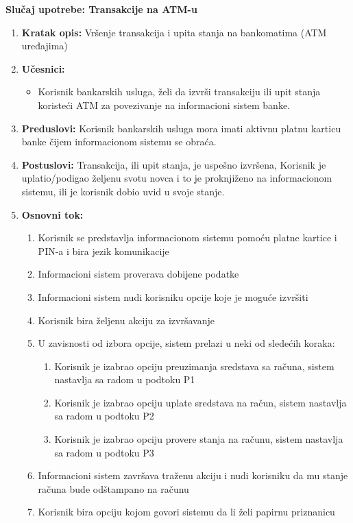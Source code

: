 \documentclass{article}
\begin{document}
\textbf{Slučaj upotrebe: Transakcije na ATM-u}
\begin{enumerate}
  \item \textbf{Kratak opis: }
  Vršenje transakcija i upita stanja na bankomatima (ATM uređajima)
  \item \textbf{Učesnici: }
    \begin{itemize}
        \item Korisnik bankarskih usluga, želi da izvrši transakciju ili upit stanja koristeći ATM za povezivanje na informacioni sistem banke.
     \end{itemize}
  \item \textbf{Preduslovi: }
    Korisnik bankarskih usluga mora imati aktivnu platnu karticu banke čijem informacionom sistemu se obraća.
  \item \textbf{Postuslovi: }
    Transakcija, ili upit stanja, je uspešno izvršena, Korisnik je uplatio/podigao željenu svotu novca i to je proknjiženo na informacionom sistemu, ili je korisnik dobio uvid u svoje stanje.
  \item \textbf{Osnovni tok: }
    \begin{enumerate}
      \item Korisnik se predstavlja informacionom sistemu pomoću platne kartice i PIN-a i bira jezik komunikacije
      \item Informacioni sistem proverava dobijene podatke
      \item Informacioni sistem nudi korisniku opcije koje je moguće izvršiti  
      \item Korisnik bira željenu akciju za izvršavanje
      \item U zavisnosti od izbora opcije, sistem prelazi u neki od sledećih koraka:  
      \begin{enumerate}
        \item Korisnik je izabrao opciju preuzimanja sredstava sa računa, sistem nastavlja sa radom u podtoku P1
        \item Korisnik je izabrao opciju uplate sredstava na račun, sistem nastavlja sa radom u podtoku P2
        \item Korisnik je izabrao opciju provere stanja na računu, sistem nastavlja sa radom u podtoku P3
      \end{enumerate}
      \item Informacioni sistem završava traženu akciju i nudi korisniku da mu stanje računa bude odštampano na računu 
      \item Korisnik bira opciju kojom govori sistemu da li želi papirnu priznanicu

\end{enumerate}
\end{enumerate}
\end{document}
